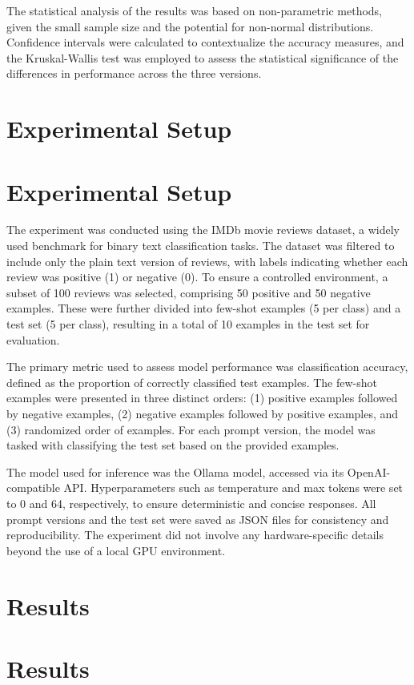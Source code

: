 \documentclass{article}
\begin{document}
The statistical analysis of the results was based on non-parametric methods, given the small sample size and the potential for non-normal distributions. Confidence intervals were calculated to contextualize the accuracy measures, and the Kruskal-Wallis test was employed to assess the statistical significance of the differences in performance across the three versions.
\section{Experimental Setup}
\section{Experimental Setup}

The experiment was conducted using the IMDb movie reviews dataset, a widely used benchmark for binary text classification tasks. The dataset was filtered to include only the plain text version of reviews, with labels indicating whether each review was positive (1) or negative (0). To ensure a controlled environment, a subset of 100 reviews was selected, comprising 50 positive and 50 negative examples. These were further divided into few-shot examples (5 per class) and a test set (5 per class), resulting in a total of 10 examples in the test set for evaluation.

The primary metric used to assess model performance was classification accuracy, defined as the proportion of correctly classified test examples. The few-shot examples were presented in three distinct orders: (1) positive examples followed by negative examples, (2) negative examples followed by positive examples, and (3) randomized order of examples. For each prompt version, the model was tasked with classifying the test set based on the provided examples.

The model used for inference was the Ollama model, accessed via its OpenAI-compatible API. Hyperparameters such as temperature and max tokens were set to 0 and 64, respectively, to ensure deterministic and concise responses. All prompt versions and the test set were saved as JSON files for consistency and reproducibility. The experiment did not involve any hardware-specific details beyond the use of a local GPU environment.
\section{Results}
\section{Results}
\end{document}
